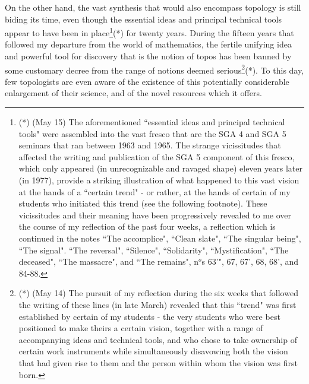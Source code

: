 On the other hand, the vast synthesis that would also encompass topology
is still biding its time, even though
the essential ideas and principal technical tools
appear to have been in place\footnote{(*) (May 15) The aforementioned ``essential ideas
and principal technical tools" were assembled into the vast fresco that are the SGA 4 and
SGA 5 seminars that ran between 1963 and 1965. The strange vicissitudes that affected the writing and
publication of the SGA 5 component of this fresco, which only appeared (in unrecognizable and ravaged shape) eleven years later (in 1977), provide a striking illustration of what happened to this vast vision
at the hands of a ``certain trend" - or rather, at the hands of certain of my students who initiated this trend (see the following footnote). These vicissitudes and their meaning
have been progressively revealed to me over the course of my reflection of the past four weeks,
a reflection which is continued in the notes ``The accomplice", ``Clean slate", ``The singular being", ``The
signal". ``The reversal", ``Silence", ``Solidarity", ``Mystification", ``The deceased",
``The massacre", and ``The remains", n$^o$s 63'", 67, 67', 68, 68', and 84-88.}(*) for twenty years. 
During the fifteen years that followed my departure from the world of mathematics, the
fertile unifying idea and powerful tool for discovery that is the notion of topos has been
banned by some customary decree from the range of notions deemed serious\footnote{(*) (May 14) The pursuit of my reflection during the six weeks that followed
the writing of these lines (in late March) revealed that this ``trend" was first established by certain of my students - the very students who were best positioned to
make theirs a certain vision, together with a range of accompanying ideas and technical tools, and who
chose to take ownership of certain work instruments while simultaneously disavowing both the
vision that had given rise to them and the person within whom the vision was
first born.}(*). To this day, few topologists are even aware of the existence of this
potentially considerable enlargement of their science, and of the novel resources which it
offers. 

